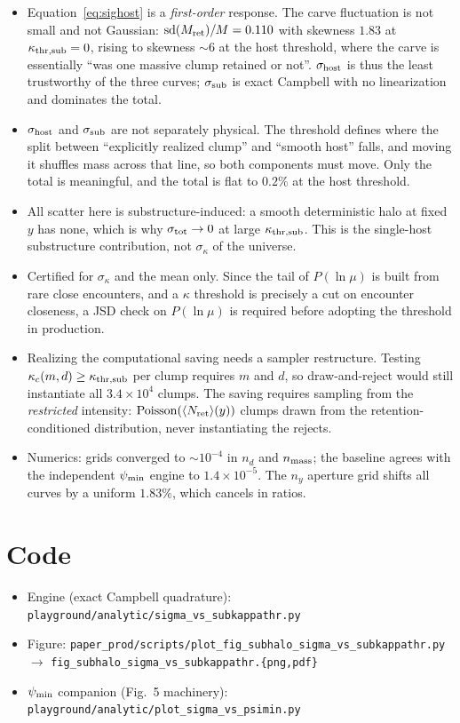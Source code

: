 \documentclass[11pt]{article}
\newcommand{\kthrs}{\kappa_{\rm thr,sub}}
\newcommand{\Mret}{M_{\rm ret}}
\begin{document}
\begin{itemize}
  \item Equation~\eqref{eq:sighost} is a \emph{first-order} response. The carve fluctuation
        is not small and not Gaussian: ${\rm sd}(\Mret)/M=0.110$ with skewness $1.83$ at
        $\kthrs=0$, rising to skewness $\sim6$ at the host threshold, where the carve is
        essentially ``was one massive clump retained or not''. $\sigma_{\rm host}$ is thus
        the least trustworthy of the three curves; $\sigma_{\rm sub}$ is exact Campbell with
        no linearization and dominates the total.
  \item $\sigma_{\rm host}$ and $\sigma_{\rm sub}$ are not separately physical. The threshold
        defines where the split between ``explicitly realized clump'' and ``smooth host''
        falls, and moving it shuffles mass across that line, so both components must move.
        Only the total is meaningful, and the total is flat to $0.2\%$ at the host threshold.
  \item All scatter here is substructure-induced: a smooth deterministic halo at fixed $y$
        has none, which is why $\sigma_{\rm tot}\to0$ at large $\kthrs$. This is the
        single-host substructure contribution, not $\sigma_\kappa$ of the universe.
  \item Certified for $\sigma_\kappa$ and the mean only. Since the tail of $P(\ln\mu)$ is
        built from rare close encounters, and a $\kappa$ threshold is precisely a cut on
        encounter closeness, a JSD check on $P(\ln\mu)$ is required before adopting the
        threshold in production.
  \item Realizing the computational saving needs a sampler restructure. Testing
        $\kappa_c(m,d)\ge\kthrs$ per clump requires $m$ and $d$, so draw-and-reject would
        still instantiate all $3.4\times10^{4}$ clumps. The saving requires sampling from the
        \emph{restricted} intensity: ${\rm Poisson}(\langle N_{\rm ret}\rangle(y))$ clumps
        drawn from the retention-conditioned distribution, never instantiating the rejects.
  \item Numerics: grids converged to $\sim10^{-4}$ in $n_d$ and $n_{\rm mass}$; the baseline
        agrees with the independent $\psi_{\rm min}$ engine to $1.4\times10^{-5}$. The $n_y$
        aperture grid shifts all curves by a uniform $1.83\%$, which cancels in ratios.
\end{itemize}

\section*{Code}
\begin{itemize}
  \item Engine (exact Campbell quadrature):
        \texttt{playground/analytic/sigma\_vs\_subkappathr.py}
  \item Figure: \texttt{paper\_prod/scripts/plot\_fig\_subhalo\_sigma\_vs\_subkappathr.py}
        $\rightarrow$ \texttt{fig\_subhalo\_sigma\_vs\_subkappathr.\{png,pdf\}}
  \item $\psi_{\rm min}$ companion (Fig.~5 machinery):
        \texttt{playground/analytic/plot\_sigma\_vs\_psimin.py}
\end{itemize}
\end{document}
